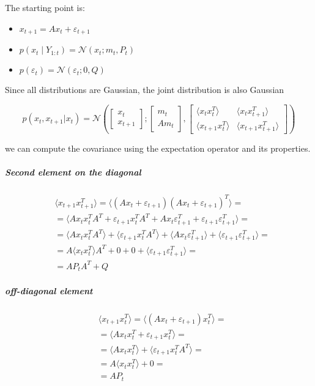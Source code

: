 \documentclass{article}
\newcommand{\E}[1]{\langle #1 \rangle} %
\newcommand{\norm}[3]{\mathcal{N}\left(#1; #2, #3\right)}
\begin{document}
The starting point is:
\begin{itemize}
    \item $x_{t+1} = Ax_{t} + \varepsilon_{t+1}$
    \item $p(x_t \mid Y_{1:t}) = \norm{x_t}{m_t}{P_t}$
    \item $p(\varepsilon_t) = \norm{\varepsilon_t}{0}{Q}$
\end{itemize}

Since all distributions are Gaussian, the joint distribution is also Gaussian

\begin{equation}\label{p_X2_start}
p(x_t, x_{t+1}|x_t) = \norm{\begin{bmatrix}x_t\\x_{t+1}\end{bmatrix}}{\begin{bmatrix}m_t\\Am_t\end{bmatrix}}{\begin{bmatrix}\E{x_tx_t^T}&\E{x_tx_{t+1}^T}\\\E{x_{t+1}x_t^T}&\E{x_{t+1}x_{t+1}^T}\end{bmatrix}}
\end{equation}

we can compute the covariance using the expectation operator and its properties.

\subparagraph{Second element on the diagonal}

\begin{equation}\label{eq:cov_x_t1_x_t1}
\begin{split}
    &\E{x_{t+1} x_{t+1}^T} = \E{(Ax_t + \varepsilon_{t+1})(Ax_t + \varepsilon_{t+1})^T} =\\ &=\E{Ax_tx_t^TA^T + \varepsilon_{t+1}x_t^TA^T + Ax_t\varepsilon_{t+1}^T + \varepsilon_{t+1}\varepsilon_{t+1}^T} =\\&=\E{Ax_tx_t^TA^T} + \E{\varepsilon_{t+1}x_t^TA^T} + \E{Ax_t\varepsilon_{t+1}^T} + \E{\varepsilon_{t+1}\varepsilon_{t+1}^T} =\\
    &=A\E{x_tx_t^T}A^T + 0 + 0 + \E{\varepsilon_{t+1}\varepsilon_{t+1}^T} = \\
    &=AP_tA^T + Q
\end{split}
\end{equation}

\subparagraph{off-diagonal element}

\begin{equation}\label{eq:cov_x_t1_x_t}
\begin{split}
    &\E{x_{t+1} x_{t}^T} = \E{(Ax_t + \varepsilon_{t+1})x_t^T} =\\ &=\E{Ax_tx_t^T + \varepsilon_{t+1}x_t^T} =\\&=\E{Ax_tx_t^T} + \E{\varepsilon_{t+1}x_t^TA^T} =\\
    &=A\E{x_tx_t^T} + 0 = \\
    &=AP_t
\end{split}
\end{equation}
\end{document}
